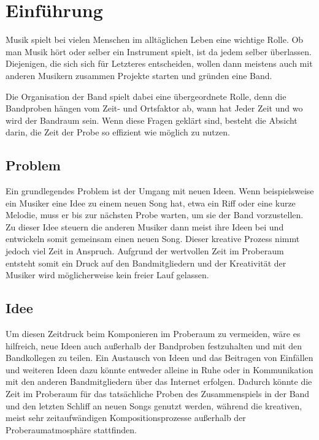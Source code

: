 \documentclass[12pt]{scrartcl}
\begin{document}



\tableofcontents

\newpage


\section{Einführung}

Musik spielt bei vielen Menschen im alltäglichen Leben eine wichtige Rolle. Ob man Musik hört oder selber ein Instrument spielt, ist da jedem selber überlassen. Diejenigen, die sich sich für Letzteres entscheiden, wollen dann meistens auch mit anderen Musikern zusammen Projekte starten und gründen eine Band.

Die Organisation der Band spielt dabei eine übergeordnete Rolle, denn die Bandproben hängen vom Zeit- und Ortsfaktor ab, wann hat Jeder Zeit und wo wird der Bandraum sein. Wenn diese Fragen geklärt sind, besteht die Absicht darin, die Zeit der Probe so effizient wie möglich zu nutzen.


\subsection{Problem}

Ein grundlegendes Problem ist der Umgang mit neuen Ideen. Wenn beispielsweise ein Musiker eine Idee zu einem neuen Song hat, etwa ein Riff oder eine kurze Melodie, muss er bis zur nächsten Probe warten, um sie der Band vorzustellen. Zu dieser Idee steuern die anderen Musiker dann meist ihre Ideen bei und entwickeln somit gemeinsam einen neuen Song. Dieser kreative Prozess nimmt jedoch viel Zeit in Anspruch. Aufgrund der wertvollen Zeit im Proberaum entsteht somit ein Druck auf den Bandmitgliedern und der Kreativität der Musiker wird möglicherweise kein freier Lauf gelassen.

\subsection{Idee}

Um diesen Zeitdruck beim Komponieren im Proberaum zu vermeiden, wäre es hilfreich, neue Ideen auch außerhalb der Bandproben festzuhalten und mit den Bandkollegen zu teilen. Ein Austausch von Ideen und das Beitragen von Einfällen und weiteren Ideen dazu könnte entweder alleine in Ruhe oder in Kommunikation mit den anderen Bandmitgliedern über das Internet erfolgen. Dadurch könnte die Zeit im Proberaum für das tatsächliche Proben des Zusammenspiels in der Band und den letzten Schliff an neuen Songs genutzt werden, während die kreativen, meist sehr zeitaufwändigen Kompositionsprozesse außerhalb der Proberaumatmosphäre stattfinden.
\end{document}
